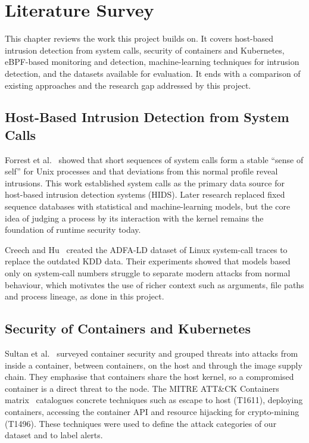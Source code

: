 \chapter{Literature Survey}

This chapter reviews the work this project builds on. It covers host-based intrusion
detection from system calls, security of containers and Kubernetes, eBPF-based
monitoring and detection, machine-learning techniques for intrusion detection, and
the datasets available for evaluation. It ends with a comparison of existing
approaches and the research gap addressed by this project.

\section{Host-Based Intrusion Detection from System Calls}

Forrest et al.~\cite{forrest1996} showed that short sequences of system calls form a
stable ``sense of self'' for Unix processes and that deviations from this normal
profile reveal intrusions. This work established system calls as the primary data
source for host-based intrusion detection systems (HIDS). Later research replaced
fixed sequence databases with statistical and machine-learning models, but the core
idea of judging a process by its interaction with the kernel remains the foundation of
runtime security today.

Creech and Hu~\cite{creech2013} created the ADFA-LD dataset of Linux system-call traces
to replace the outdated KDD data. Their experiments showed that models based only on
system-call numbers struggle to separate modern attacks from normal behaviour, which
motivates the use of richer context such as arguments, file paths and process lineage,
as done in this project.

\section{Security of Containers and Kubernetes}

Sultan et al.~\cite{sultan2019} surveyed container security and grouped threats into
attacks from inside a container, between containers, on the host and through the
image supply chain. They emphasise that containers share the host kernel, so a
compromised container is a direct threat to the node. The MITRE ATT\&CK Containers
matrix~\cite{mitre} catalogues concrete techniques such as escape to host (T1611),
deploying containers, accessing the container API and resource hijacking for
crypto-mining (T1496). These techniques were used to define the attack categories of
our dataset and to label alerts.

